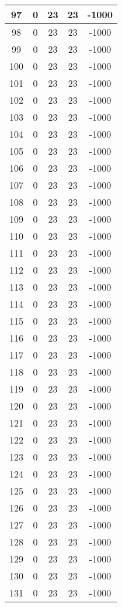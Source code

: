 \documentclass[letterpaper, 12pt]{article}
\begin{document}
\begin{longtable}{|c|c|c|c|c|}
\hline
97 & 0 & 23 & 23 & -1000 \\
\hline
98 & 0 & 23 & 23 & -1000 \\
\hline
99 & 0 & 23 & 23 & -1000 \\
\hline
100 & 0 & 23 & 23 & -1000 \\
\hline
101 & 0 & 23 & 23 & -1000 \\
\hline
102 & 0 & 23 & 23 & -1000 \\
\hline
103 & 0 & 23 & 23 & -1000 \\
\hline
104 & 0 & 23 & 23 & -1000 \\
\hline
105 & 0 & 23 & 23 & -1000 \\
\hline
106 & 0 & 23 & 23 & -1000 \\
\hline
107 & 0 & 23 & 23 & -1000 \\
\hline
108 & 0 & 23 & 23 & -1000 \\
\hline
109 & 0 & 23 & 23 & -1000 \\
\hline
110 & 0 & 23 & 23 & -1000 \\
\hline
111 & 0 & 23 & 23 & -1000 \\
\hline
112 & 0 & 23 & 23 & -1000 \\
\hline
113 & 0 & 23 & 23 & -1000 \\
\hline
114 & 0 & 23 & 23 & -1000 \\
\hline
115 & 0 & 23 & 23 & -1000 \\
\hline
116 & 0 & 23 & 23 & -1000 \\
\hline
117 & 0 & 23 & 23 & -1000 \\
\hline
118 & 0 & 23 & 23 & -1000 \\
\hline
119 & 0 & 23 & 23 & -1000 \\
\hline
120 & 0 & 23 & 23 & -1000 \\
\hline
121 & 0 & 23 & 23 & -1000 \\
\hline
122 & 0 & 23 & 23 & -1000 \\
\hline
123 & 0 & 23 & 23 & -1000 \\
\hline
124 & 0 & 23 & 23 & -1000 \\
\hline
125 & 0 & 23 & 23 & -1000 \\
\hline
126 & 0 & 23 & 23 & -1000 \\
\hline
127 & 0 & 23 & 23 & -1000 \\
\hline
128 & 0 & 23 & 23 & -1000 \\
\hline
129 & 0 & 23 & 23 & -1000 \\
\hline
130 & 0 & 23 & 23 & -1000 \\
\hline
131 & 0 & 23 & 23 & -1000 \\

\end{longtable}
\end{document}
